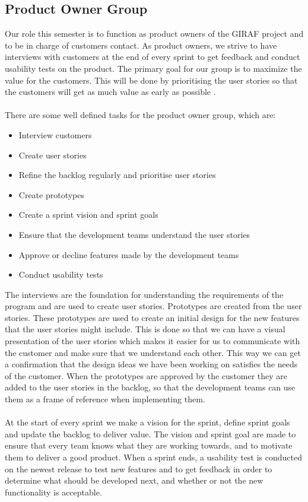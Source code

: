 \subsection{Product Owner Group}
Our role this semester is to function as product owners of the GIRAF project and to be in charge of customers contact. 
As product owners, we strive to have interviews with customers at the end of every sprint to get feedback and conduct usability tests on the product.
The primary goal for our group is to maximize the value for the customers. 
This will be done by prioritising the user stories so that the customers will get as much value as early as possible \autocite{TheScrumGuide}.\\
\\
There are some well defined tasks for the product owner group, which are:
\begin{itemize}
    \item Interview customers
    \item Create user stories    
    \item Refine the backlog regularly and prioritise user stories
    \item Create prototypes
    \item Create a sprint vision and sprint goals
    \item Ensure that the development teams understand the user stories
    \item Approve or decline features made by the development teams
    \item Conduct usability tests
\end{itemize}
\noindent
The interviews are the foundation for understanding the requirements of the program and are used to create user stories. 
Prototypes are created from the user stories.
These prototypes are used to create an initial design for the new features that the user stories might include. 
This is done so that we can have a visual presentation of the user stories which makes it easier for us to communicate with the customer and make sure that we understand each other. 
This way we can get a confirmation that the design ideas we have been working on satisfies the needs of the customer.
When the prototypes are approved by the customer they are added to the user stories in the backlog, so that the development teams can use them as a frame of reference when implementing them.
\\\\
At the start of every sprint we make a vision for the sprint, define sprint goals and update the backlog to deliver value. 
The vision and sprint goal are made to ensure that every team knows what they are working towards, and to motivate them to deliver a good product.
When a sprint ends, a usability test is conducted on the newest release to test new features and to get feedback in order to determine what should be developed next, and whether or not the new functionality is acceptable.

